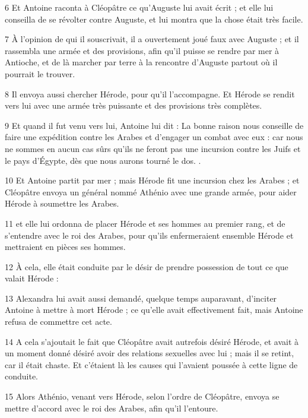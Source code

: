 \par 6 Et Antoine raconta à Cléopâtre ce qu'Auguste lui avait écrit ; et elle lui conseilla de se révolter contre Auguste, et lui montra que la chose était très facile.

\par 7 À l'opinion de qui il souscrivait, il a ouvertement joué faux avec Auguste ; et il rassembla une armée et des provisions, afin qu'il puisse se rendre par mer à Antioche, et de là marcher par terre à la rencontre d'Auguste partout où il pourrait le trouver.

\par 8 Il envoya aussi chercher Hérode, pour qu'il l'accompagne. Et Hérode se rendit vers lui avec une armée très puissante et des provisions très complètes.

\par 9 Et quand il fut venu vers lui, Antoine lui dit : La bonne raison nous conseille de faire une expédition contre les Arabes et d'engager un combat avec eux : car nous ne sommes en aucun cas sûrs qu'ils ne feront pas une incursion contre les Juifs et le pays d'Égypte, dès que nous aurons tourné le dos. .

\par 10 Et Antoine partit par mer ; mais Hérode fit une incursion chez les Arabes ; et Cléopâtre envoya un général nommé Athénio avec une grande armée, pour aider Hérode à soumettre les Arabes.

\par 11 et elle lui ordonna de placer Hérode et ses hommes au premier rang, et de s'entendre avec le roi des Arabes, pour qu'ils enfermeraient ensemble Hérode et mettraient en pièces ses hommes.

\par 12 À cela, elle était conduite par le désir de prendre possession de tout ce que valait Hérode :

\par 13 Alexandra lui avait aussi demandé, quelque temps auparavant, d'inciter Antoine à mettre à mort Hérode ; ce qu'elle avait effectivement fait, mais Antoine refusa de commettre cet acte.

\par 14 A cela s'ajoutait le fait que Cléopâtre avait autrefois désiré Hérode, et avait à un moment donné désiré avoir des relations sexuelles avec lui ; mais il se retint, car il était chaste. Et c'étaient là les causes qui l'avaient poussée à cette ligne de conduite.

\par 15 Alors Athénio, venant vers Hérode, selon l'ordre de Cléopâtre, envoya se mettre d'accord avec le roi des Arabes, afin qu'il l'entoure.

